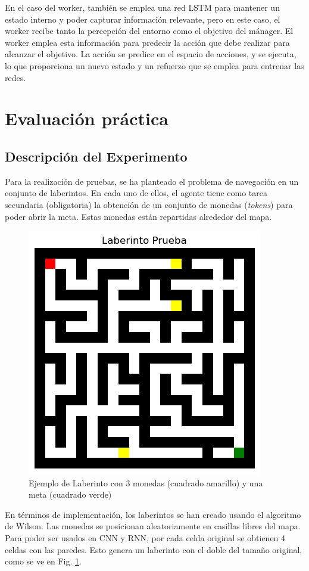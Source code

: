\documentclass[letterpaper]{article} %
\begin{document}
En el caso del worker, también se emplea una red LSTM para mantener un estado interno y poder capturar información relevante,
pero en este caso, el worker recibe tanto la percepción del entorno como el objetivo del mánager. El worker emplea esta información
para predecir la acción que debe realizar para alcanzar el objetivo. La acción se predice en el espacio de acciones, y se ejecuta,
lo que proporciona un nuevo estado y un refuerzo que se emplea para entrenar las redes.

\section{Evaluación práctica}
\subsection{Descripción del Experimento}

Para la realización de pruebas, se ha planteado el problema de navegación en un conjunto de laberintos. 
En cada uno de ellos, el agente tiene como tarea secundaria (obligatoria) la obtención de un conjunto de 
monedas (\textit{tokens}) para poder abrir la meta. Estas monedas están repartidas alrededor del mapa.

\begin{figure}[H]
    \centering
    \includegraphics[width=0.7\columnwidth]{maze.png}
    \caption{Ejemplo de Laberinto con 3 monedas (cuadrado amarillo) y una meta (cuadrado verde)\label{fig:maze-example}}
\end{figure}

En términos de implementación, los laberintos se han creado usando el algoritmo de Wilson. Las monedas se posicionan
aleatoriamente en casillas libres del mapa. Para poder ser usados en CNN y RNN, por cada celda original se obtienen 4 celdas con las paredes.
Esto genera un laberinto con el doble del tamaño original, como se ve en Fig. \ref{fig:maze-example}.
\end{document}
